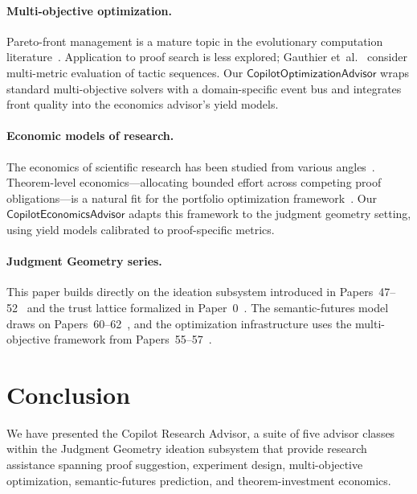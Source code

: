 \documentclass[11pt]{article}
\begin{document}
\paragraph{Multi-objective optimization.}
Pareto-front management is a mature topic in the evolutionary
computation literature~\cite{deb2002nsga,zhang2007moead,bader2011hype}.
Application to proof search is less explored;
Gauthier et~al.~\cite{gauthier2021tactictoe} consider
multi-metric evaluation of tactic sequences.  Our
$\mathsf{CopilotOptimizationAdvisor}$ wraps standard
multi-objective solvers with a domain-specific event bus and
integrates front quality into the economics advisor's yield
models.

\paragraph{Economic models of research.}
The economics of scientific research has been studied from
various angles~\cite{dasgupta1994toward,stephan1996economics}.
Theorem-level economics—allocating bounded effort across
competing proof obligations—is a natural fit for the portfolio
optimization framework~\cite{markowitz1952portfolio}.  Our
$\mathsf{CopilotEconomicsAdvisor}$ adapts this framework to the
judgment geometry setting, using yield models calibrated to
proof-specific metrics.

\paragraph{Judgment Geometry series.}
This paper builds directly on the ideation subsystem introduced
in Papers~47--52~\cite{paper47,paper48,paper49,paper50,paper51,paper52}
and the trust lattice formalized in
Paper~0~\cite{paper00}.  The semantic-futures model draws on
Papers~60--62~\cite{paper60,paper61,paper62}, and the
optimization infrastructure uses the multi-objective framework
from Papers~55--57~\cite{paper55,paper56,paper57}.

\section{Conclusion}\label{sec:conclusion}

We have presented the Copilot Research Advisor, a suite of five
advisor classes within the Judgment Geometry ideation subsystem
that provide research assistance spanning proof suggestion,
experiment design, multi-objective optimization, semantic-futures
prediction, and theorem-investment economics.
\end{document}
